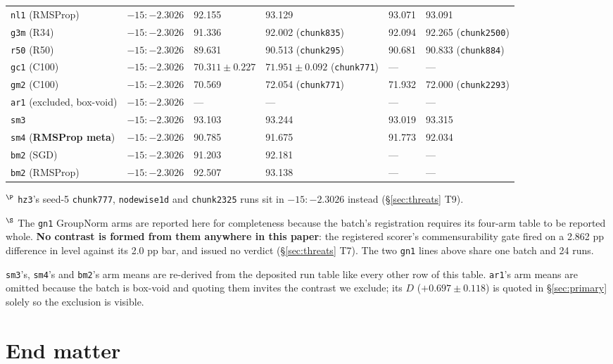 \documentclass[10pt,letterpaper]{article}
\newcommand{\Dstat}{D}                         %
\newcommand{\arm}[1]{\texttt{#1}}
\begin{document}
\begin{table}[htbp]
\begin{tabular}{@{}llllll@{}}
\arm{nl1} (RMSProp) & $-15{:}{-}2.3026$ & 92.155 & 93.129 & 93.071 & 93.091 \\
\arm{g3m} (R34) & $-15{:}{-}2.3026$ & 91.336 & 92.002 (\arm{chunk835}) & 92.094 &
  92.265 (\arm{chunk2500}) \\
\arm{r50} (R50) & $-15{:}{-}2.3026$ & 89.631 & 90.513 (\arm{chunk295}) & 90.681 &
  90.833 (\arm{chunk884}) \\
\arm{gc1} (C100) & $-15{:}{-}2.3026$ & $70.311 \pm 0.227$ & $71.951 \pm 0.092$ (\arm{chunk771}) &
  --- & --- \\
\arm{gm2} (C100) & $-15{:}{-}2.3026$ & 70.569 & 72.054 (\arm{chunk771}) & 71.932 &
  72.000 (\arm{chunk2293}) \\
\arm{ar1} (excluded, box-void) & $-15{:}{-}2.3026$ & --- & --- & --- & --- \\
\arm{sm3} & $-15{:}{-}2.3026$ & 93.103 & 93.244 & 93.019 & 93.315 \\
\arm{sm4} (\textbf{RMSProp meta}) & $-15{:}{-}2.3026$ & 90.785 & 91.675 & 91.773 & 92.034 \\
\arm{bm2} (SGD) & $-15{:}{-}2.3026$ & 91.203 & 92.181 & --- & --- \\
\arm{bm2} (RMSProp) & $-15{:}{-}2.3026$ & 92.507 & 93.138 & --- & --- \\
\bottomrule
\end{tabular}
\end{table}

$^{\P}$ \arm{hz3}'s seed-5 \arm{chunk777}, \arm{nodewise1d} and \arm{chunk2325} runs sit in
$-15{:}{-}2.3026$ instead (\S\ref{sec:threats} T9).

$^{\S}$ The \arm{gn1} GroupNorm arms are reported here for completeness because the batch's
registration requires its four-arm table to be reported whole. \textbf{No contrast is formed from
them anywhere in this paper}: the registered scorer's commensurability gate fired on a 2.862 pp
difference in level against its 2.0 pp bar, and issued no verdict (\S\ref{sec:threats} T7). The two \arm{gn1}
lines above share one batch and 24 runs.

\arm{sm3}'s, \arm{sm4}'s and \arm{bm2}'s arm means are re-derived from the deposited run table like
every other row of this table. \arm{ar1}'s arm means are omitted because the batch is box-void and quoting them
invites the contrast we exclude; its $\Dstat$ ($+0.697 \pm 0.118$) is quoted in \S\ref{sec:primary}
solely so the exclusion is visible.

\section*{End matter}
\end{document}
